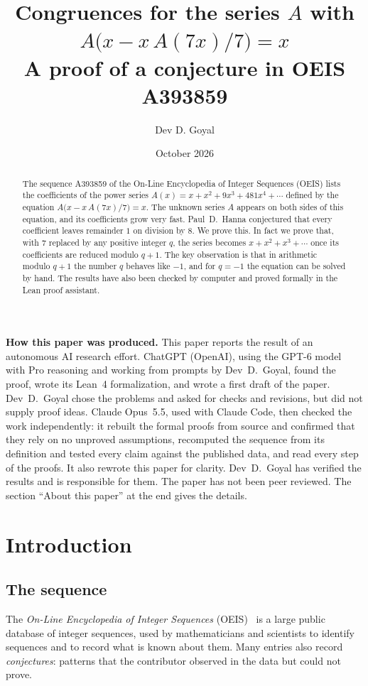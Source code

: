 \documentclass[11pt,a4paper]{article}
\title{Congruences for the series $A$ with $A\bigl(x-x\,A(7x)/7\bigr)=x$\\[6pt]\large A proof of a conjecture in OEIS A393859}
\author{Dev D. Goyal}
\date{October 2026}
\theoremstyle{definition}
\theoremstyle{remark}
\begin{document}
\maketitle
\begin{abstract}
The sequence A393859 of the On-Line Encyclopedia of Integer Sequences (OEIS) lists the coefficients of the power
series $A(x)=x+x^2+9x^3+481x^4+\cdots$ defined by the equation
$A\bigl(x-x\,A(7x)/7\bigr)=x$. The unknown series $A$ appears on both sides of this equation, and its coefficients grow very fast.
Paul~D.~Hanna conjectured that every coefficient leaves remainder $1$ on division by $8$. We prove this. In fact we prove that, with $7$ replaced by any positive integer $q$, the series becomes $x+x^2+x^3+\cdots$ once its coefficients are reduced modulo $q+1$. The key observation is that in arithmetic modulo $q+1$ the number $q$ behaves like $-1$, and
for $q=-1$ the equation can be solved by hand. The results have also been checked by computer and proved formally in the
Lean proof assistant.
\end{abstract}
\begin{center}\begin{minipage}{0.88\linewidth}\small
\textbf{How this paper was produced.} This paper reports the result of an autonomous AI research effort.
ChatGPT (OpenAI), using the GPT-6 model with Pro reasoning and working from prompts by Dev~D.~Goyal, found the proof, wrote its Lean~4 formalization, and wrote a first draft of the paper.
Dev~D.~Goyal chose the problems and asked for checks and revisions, but did not supply proof ideas.
Claude Opus~5.5, used with Claude Code, then checked the work independently: it rebuilt the formal proofs from
source and confirmed that they rely on no unproved assumptions, recomputed the sequence from its definition and tested
every claim against the published data, and read every step of the proofs. It also rewrote this paper for clarity.
Dev~D.~Goyal has verified the results and is responsible for them. The paper has not been peer reviewed.
The section ``About this paper'' at the end gives the details.
\end{minipage}\end{center}

\section{Introduction}

\subsection{The sequence}\label{sec:sequence}
The \emph{On-Line Encyclopedia of Integer Sequences} (OEIS)~\cite{oeisdb} is a large public database of integer
sequences, used by mathematicians and scientists to identify sequences and to record what is known about them. Many
entries also record \emph{conjectures}: patterns that the contributor observed in the data but could not prove.
\end{document}

